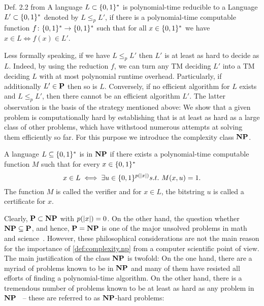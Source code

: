 \begin{definition}{Def. 2.2 from \cite{Arora_2009_Computational}}
  \label{def:complexity.reducibility}
  A language $L \subset \BitStrings$ is polynomial-time reducible to a Language $L' \subset \BitStrings$ denoted by $L \le_p L'$, if there is a polynomial-time computable function $f\colon \BitStrings \to \BitStrings$ such that for all $x \in \BitStrings$ we have $x \in L \iff f(x) \in L'$.
\end{definition}

Less formally speaking, if we have $L \le_p L'$ then $L'$ is at least as hard to decide as $L$.
Indeed, by using the reduction $f$, we can turn any TM deciding $L'$ into a TM deciding $L$ with at most polynomial runtime overhead.
Particularly, if additionally $L' \in \P$ then so is $L$.
Conversely, if no efficient algorithm for $L$ exists and $L \le_p L'$, then there cannot be an efficient algorithm $L'$.
The latter observation is the basis of the strategy mentioned above:
We show that a given problem is computationally hard by establishing that is at least as hard as a large class of other problems, which have withstood numerous attempts at solving them efficiently so far.
For this purpose we introduce the complexity class $\NP$.

\begin{definition}
  \label{def:complexity.np}
  A language $L \subseteq \BitStrings$ is in $\NP$ if there exists a polynomial-time computable function $M$ such that for every $x \in \BitStrings$
  \[
    x \in L \iff \exists u \in \{ 0, 1 \}^{p(\abs{x})} s.t.\ M(x, u) = 1.
  \]
  The function $M$ is called the verifier and for $x \in L$, the bitstring $u$ is called a certificate for $x$.
\end{definition}

Clearly, $\P \subset \NP$ with $p(\abs{x}) = 0$.
On the other hand, the question whether $\NP \subseteq \P$, and hence, $\P = \NP$ is one of the major unsolved problems in math and science~\cite{Cook_2000_P,Aaronson_????_P,Garey_2002_Computers}.
However, these philosophical considerations are not the main reason for the importance of \cref{def:complexity.np} from a computer scientific point of view.
The main justification of the class $\NP$ is twofold:
On the one hand, there are a myriad of problems known to be in $\NP$ and many of them have resisted all efforts of finding a polynomial-time algorithm.
On the other hand, there is a tremendous number of problems known to be at least as hard as any problem in $\NP$~\cite{Garey_2002_Computers} -- these are referred to as $\NP$-hard problems:

